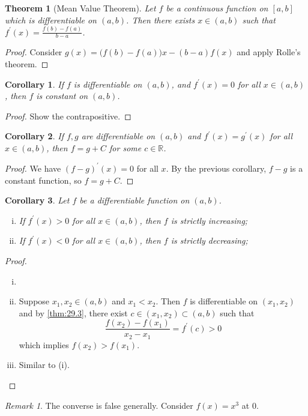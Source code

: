 \documentclass[12pt, lettersize]{book}
\theoremstyle{plain}
\newtheorem{thm}{Theorem}[section]
\newtheorem{cor}{Corollary}[thm]
\theoremstyle{definition}
\theoremstyle{remark}
\newtheorem*{rem}{Remark}
\newcommand{\R}{\mathbb{R}}
\begin{document}
			\begin{thm}[Mean Value Theorem]\label{thm:29.3, MVT}
			Let $f$ be a continuous function on $[a,b]$ which is differentiable on $(a,b)$. Then there exists $x\in(a,b)$ such that $f^\prime(x)=\frac{f(b)-f(a)}{b-a}$.
			\end{thm}
			\begin{proof}
			Consider $g(x)=\big(f(b)-f(a)\big)x-(b-a)f(x)$ and apply Rolle's theorem. 
			\end{proof}
			\begin{cor}
			If $f$ is differentiable on $(a,b)$, and $f^\prime(x)=0$ for all $x\in(a,b)$, then $f$ is constant on $(a,b)$.
			\end{cor}
			\begin{proof}
				Show the contrapositive.
			\end{proof}
			\begin{cor}
			If $f,g$ are differentiable on $(a,b)$ and $f^\prime(x)=g^\prime(x)$ for all $x\in(a,b)$, then $f=g+C$ for some $c\in\R$.
			\end{cor}
			\begin{proof}
				We have $(f-g)^\prime(x)=0$ for all $x$. By the previous corollary, $f-g$ is a constant function, so $f=g+C$.
			\end{proof}
			\newpage
			\begin{cor}
			Let $f$ be a differentiable function on $(a,b)$.
			\begin{enumerate}[(i)]
				\item If $f^\prime(x)>0$ for all $x\in(a,b)$, then $f$ is strictly increasing;
				\item If $f^\prime(x)<0$ for all $x\in(a,b)$, then $f$ is strictly decreasing; 
			\end{enumerate}
			\end{cor}
			\begin{proof}
			\begin{enumerate}[(i)]
				\item[]
				\item Suppose $x_1,x_2\in(a,b)$ and $x_1<x_2$. Then $f$ is differentiable on $(x_1,x_2)$ and by \ref{thm:29.3}, there exist $c\in(x_1,x_2)\subset(a,b)$ such that
				\begin{displaymath}
					\frac{f(x_2)-f(x_1)}{x_2-x_1}=f^\prime(c)>0
				\end{displaymath}
				which implies $f(x_2)>f(x_1)$.
				\item Similar to (i).
			\end{enumerate}
			\end{proof}
			\begin{rem}
			The converse is false generally. Consider $f(x)=x^3$ at $0$.
			\end{rem}
			
\end{document}

